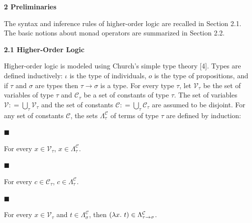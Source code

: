 
 
\par\medskip\noindent\textbf{2 Preliminaries}\par
 
 
The syntax and inference rules of higher-order logic are recalled in Section 2.1. The basic notions about monad operators are summarized in Section 2.2.\par
 
 
 
\par\medskip\noindent\textbf{2.1 Higher-Order Logic}\par
 
 
Higher-order logic is modeled using Church’s simple type theory [4]. Types are defined inductively: $\iota$ is the type of individuals, $o$ is the type of propositions, and if $\tau$ and $\sigma$ are types then $\tau\rightarrow\sigma$ is a type. For every type $\tau$, let $\mathcal{V}_{\tau}$ be the set of variables of type $\tau$ and $\mathcal{C}_{\tau}$ be a set of constants of type $\tau$. The set of variables $\mathcal{V}\mathrel{\mathop{:}}=\bigcup_{\tau}\mathcal{V}_{\tau}$ and the set of constants $\mathcal{C}\mathrel{\mathop{:}}=\bigcup_{\tau}\mathcal{C}_{\tau}$ are assumed to be disjoint. For any set of constants $\mathcal{C}$, the sets $\Lambda^{\mathcal{C}}_{\tau}$ of terms of type $\tau$ are defined by induction:\par
  
\par\noindent  $\blacksquare$ 
 
For every $x\in\mathcal{V}_{\tau}$, $x\in\Lambda^{\mathcal{C}}_{\tau}$.\par
 
 
 
\par\noindent  $\blacksquare$ 
 
For every $c\in\mathcal{C}_{\tau}$, $c\in\Lambda^{\mathcal{C}}_{\tau}$.\par
 
 
 
\par\noindent  $\blacksquare$ 
 
For every $x\in\mathcal{V}_{\tau}$ and $t\in\Lambda^{\mathcal{C}}_{\sigma}$, then $(\lambda x.\leavevmode\nobreak\ t)\in\Lambda^{\mathcal{C}}_{\tau\rightarrow\sigma}$.\par
 
